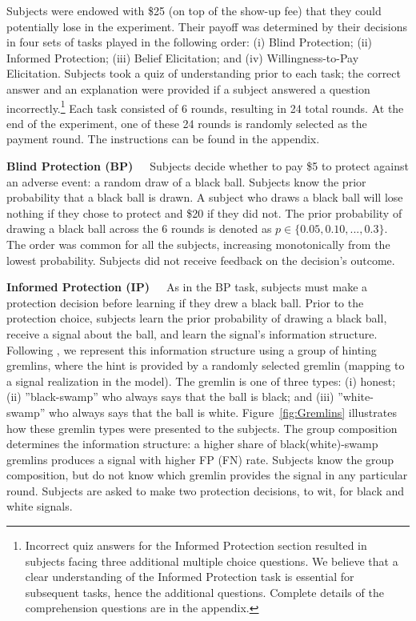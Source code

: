 \documentclass[12pt,a4paper]{article}
\begin{document}
Subjects were endowed with \$25 (on top of the show-up fee) that they could potentially lose in the experiment. Their payoff was determined by their decisions in four sets of tasks played in the following order: (i) Blind Protection; (ii) Informed Protection; (iii) Belief Elicitation; and (iv) Willingness-to-Pay Elicitation. Subjects took a quiz of understanding prior to each task; the correct answer and an explanation were provided if a subject answered a question incorrectly.\footnote{Incorrect quiz answers for the Informed Protection section resulted in subjects facing three additional multiple choice questions. We believe that a clear understanding of the Informed Protection task is essential for subsequent tasks, hence the additional questions. Complete details of the comprehension questions are in the appendix.} Each task consisted of 6 rounds, resulting in 24 total rounds. At the end of the experiment, one of these 24 rounds is randomly selected as the payment round. The instructions can be found in the appendix.


\bigskip
\noindent\textbf{Blind Protection (BP)}\ \ \ Subjects decide whether to pay \$5 to protect against an adverse event: a random draw of a black ball.  Subjects know the prior probability that a black ball is drawn. A subject who draws a black ball will lose nothing if they chose to protect and \$20 if they did not. The prior probability of drawing a black ball across the 6 rounds is denoted as $p \in \{0.05,0.10,...,0.3\}$. The order was common for all the subjects, increasing monotonically from the lowest probability. Subjects did not receive feedback on the decision's outcome.

\bigskip
\noindent\textbf{Informed Protection (IP)}\ \ \ As in the BP task, subjects must make a protection decision before learning if they drew a black ball. Prior to the protection choice, subjects learn the prior probability of drawing a black ball, receive a signal about the ball, and learn the signal's information structure. Following \citet{coutts_good_2019}, we represent this information structure using a group of hinting gremlins, where the hint is provided by a randomly selected gremlin (mapping to a signal realization in the model). The gremlin is one of three types: (i) honest; (ii) ''black-swamp'' who always says that the ball is black; and (iii) ''white-swamp'' who always says that the ball is white. Figure~\ref{fig:Gremlins} illustrates how these gremlin types were presented to the subjects. The group composition determines the information structure: a higher share of black(white)-swamp gremlins produces a signal with higher FP (FN) rate. Subjects know the group composition, but do not know which gremlin provides the signal in any particular round. Subjects are asked to make two protection decisions, to wit, for black and white signals.
\end{document}
